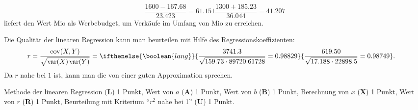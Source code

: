 \begin{loesung}
\begin{teilaufgaben}
\[{\frac{1600 - 167.68}{23.423} = 61.151
}{
\frac{1300 + 185.23}{36.044} = 41.207
}
\]
liefert den Wert
Mio
als Werbebudget, um Verkäufe im Umfang von
Mio
zu erreichen.
\item
Die Qualität der linearen Regression kann man beurteilen mit Hilfe 
des Regressionskoeffizienten:
\begin{align*}
r
&=
\frac{
\operatorname{cov}(X,Y)
}{
\sqrt{\operatorname{var}(X)\operatorname{var}(Y)}
}
=
\ifthenelse{\boolean{lang}}{
\frac{3741.3}{\sqrt{159.73\cdot 89720.61728}} = 0.98829
}{
\frac{619.50}{\sqrt{17.188\cdot 22898.5}} = 0.98749
}.
\end{align*}
Da $r$ nahe bei $1$ ist, kann man die von einer guten Approximation sprechen.
\begin{center}
\end{center}
\end{teilaufgaben}
\end{loesung}

\begin{bewertung}
Methode der linearen Regression ({\bf L}) 1 Punkt,
Wert von $a$ ({\bf A}) 1 Punkt,
Wert von $b$ ({\bf B}) 1 Punkt,
Berechnung von $x$ ({\bf X}) 1 Punkt,
Wert von $r$ ({\bf R}) 1 Punkt,
Beurteilung mit Kriterium ``$r^2$ nahe bei 1'' ({\bf U}) 1 Punkt.
\end{bewertung}


